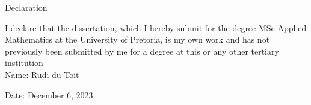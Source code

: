 \documentclass[main.tex]{subfiles}
\begin{document}
\newpage
\begin{center}
  {\Large Declaration}
\end{center}

I declare that the dissertation, which I hereby submit for the degree MSc Applied Mathematics at the University of Pretoria, is my own work and has not previously been submitted by me for a degree at this or any other tertiary institution\\

Name: Rudi du Toit

Date: December 6, 2023
\end{document}
